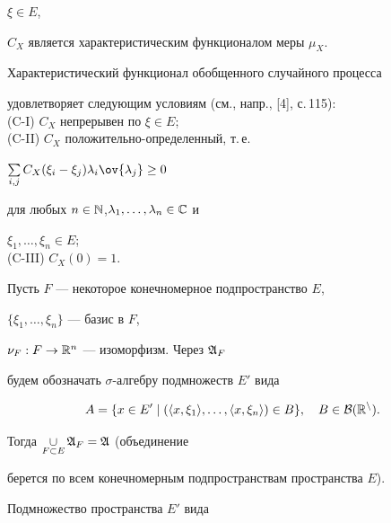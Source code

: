 $\xi\in E$,


$C_X$ является характеристическим функционалом меры $\mu_X$.





Характеристический функционал обобщенного случайного процесса


удовлетворяет следующим условиям (см., напр., [4], с.\,115):\\






(C-I) $C_X$ непрерывен по $\xi\in E$;\\


(C-II) $C_X$ положительно-определенный, т.\,е.


$\sum\limits_{i,j}C_X(\xi_i-\xi_j)\lambda_i\ov{\lambda_j}\geq0$


для любых $n\in\Bbb{N}$,\linebreak $\lambda_1,\dotsc,\lambda_n\in\Bbb{C}$ и


$\xi_1,\dotsc,\xi_n\in E$;\\


(C-III) $C_X(0)=1$.









Пусть $F$ --- некоторое конечномерное подпространство $E$,


$\{\xi_1,\dotsc,\xi_n \}$ --- базис в $F$,


$\nu_F:F\to\Bbb{R}^n$ --- изоморфизм. Через $\frak{A}_F$


будем обозначать $\sigma$-алгебру подмножеств $E'$ вида


$$


A= \{ x\in E'\mid (\la x,\xi_1\ra, \dotsc,\la x,\xi_n\ra)\in


B \}, \quad B\in\cal{B}(\Bbb{R}^n).


$$


Тогда $\mathop{\cup}\limits_{F\subset E}\frak{A}_F=\frak{A}$ (объединение


берется по всем конечномерным подпространствам пространства $E$).


Подмножество пространства $E'$ вида


$$



